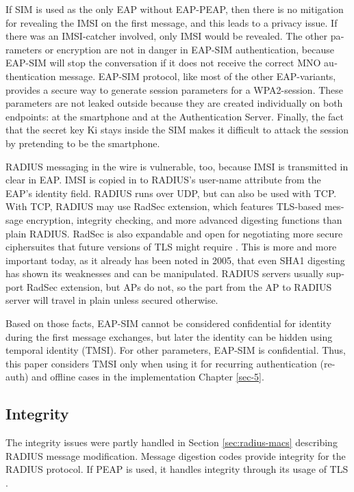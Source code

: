 \documentclass[12pt,a4paper,english]{tutthesis}
\begin{document}
\begin{otherlanguage}{english}
If SIM is used as the only EAP without EAP-PEAP, then there is no
mitigation for revealing the IMSI on the first message, and this leads to
a privacy issue.  If there was an IMSI-catcher involved, only IMSI would
be revealed.  The other parameters or encryption are not in danger in
EAP-SIM authentication, because EAP-SIM will stop the conversation if it
does not receive the correct MNO authentication message.  EAP-SIM
protocol, like most of the other EAP-variants, provides a secure way
to generate session parameters for a WPA2-session. These parameters are not
leaked outside because they are created individually on both
endpoints: at the smartphone and at the Authentication Server.
Finally, the fact that the secret key Ki stays inside the SIM makes it
difficult to attack the session by pretending to be the smartphone.






RADIUS messaging in the wire is vulnerable, too, because IMSI is transmitted in clear 
in EAP. IMSI is copied in to RADIUS's user-name attribute from the EAP's identity field.
RADIUS runs over UDP, but can also be used with TCP. With TCP, RADIUS
may use RadSec extension, which features TLS-based message encryption,
integrity checking, and more advanced digesting functions than plain
RADIUS.
RadSec is also expandable and open 
for negotiating more secure ciphersuites that future 
versions of TLS might require \cite{rfc6614}. This is
more and more important today, as it already has been noted in 2005,
that even SHA1 digesting has shown its weaknesses and can be manipulated.
RADIUS servers usually support RadSec extension, but APs do not, so 
the part from the AP to RADIUS server will travel in plain unless
secured otherwise.


Based on those facts, EAP-SIM cannot be considered confidential for identity
during the first message exchanges, but later the identity can be hidden
using temporal identity (TMSI). 
For other parameters, EAP-SIM is confidential.
Thus, this paper considers TMSI only when using it for recurring
authentication (re-auth) and offline cases in the implementation Chapter
\ref{sec-5}.
\subsection{Integrity}
\label{sec-6-1-2}



The integrity issues were partly handled in Section \ref{sec:radius-macs} describing
RADIUS message modification.
Message digestion codes provide integrity for the RADIUS protocol.
If PEAP is used, it handles integrity through its usage of
 TLS \cite{peap}.


\end{otherlanguage}
\end{document}
